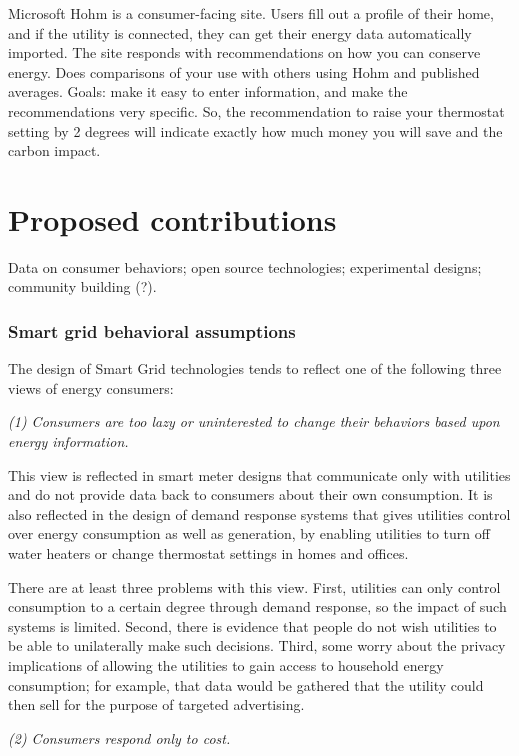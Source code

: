 Microsoft Hohm is a consumer-facing site.  Users fill out a profile of
their home, and if the utility is connected, they can get their energy data
automatically imported.  The site responds with recommendations on how you
can conserve energy. Does comparisons of your use with others using Hohm
and
published averages.   Goals: make it easy to enter information, and make
the recommendations very specific.  So, the recommendation to raise your
thermostat setting by 2 degrees will indicate exactly how much money you
will save and the carbon impact.


\section{Proposed contributions}

Data on consumer behaviors; open source technologies; experimental designs;
community building (?).


 
\subsubsection{Smart grid behavioral assumptions}

The design of Smart Grid technologies tends to reflect one of the following
three views of energy consumers:

{\em (1) Consumers are too lazy or uninterested to change their 
behaviors based upon energy information.}

This view is reflected in smart meter designs that communicate only with
utilities and do not provide data back to consumers about their own
consumption. It is also reflected in the design of demand response systems
that gives utilities control over energy consumption as well as
generation, by enabling utilities to turn off water heaters or change
thermostat settings in homes and offices. 

There are at least three problems with this view. First, utilities can only
control consumption to a certain degree through demand response, so the
impact of such systems is limited.  Second, there is evidence that people
do not wish utilities to be able to unilaterally make such decisions.
Third, some worry about the privacy implications of allowing the utilities
to gain access to household energy consumption; for example, that data
would be gathered that the utility could then sell for the purpose of
targeted advertising.

{\em (2) Consumers respond only to cost.}

